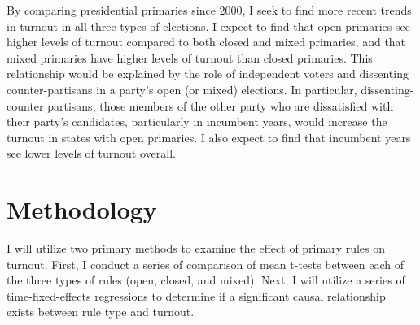 \documentclass[12pt]{article}
\begin{document}
\begin{doublespace}
\par
	By comparing presidential primaries since 2000, I seek to find more recent trends in turnout in all three types of elections. I expect to find that open primaries see higher levels of turnout compared to both closed and mixed primaries, and that mixed primaries have higher levels of turnout than closed primaries. This relationship would be explained by the role of independent voters and dissenting counter-partisans in a party’s open (or mixed) elections. In particular, dissenting-counter partisans, those members of the other party who are dissatisfied with their party’s candidates, particularly in incumbent years, would increase the turnout in states with open primaries. I also expect to find that incumbent years see lower levels of turnout overall. 
	\section{Methodology}
	I will utilize two primary methods to examine the effect of primary rules on turnout. First, I conduct a series of comparison of mean t-tests between each of the three types of rules (open, closed, and mixed). Next, I will utilize a series of time-fixed-effects regressions to determine if a significant causal relationship exists between rule type and turnout.\par

\end{doublespace}
\end{document}
